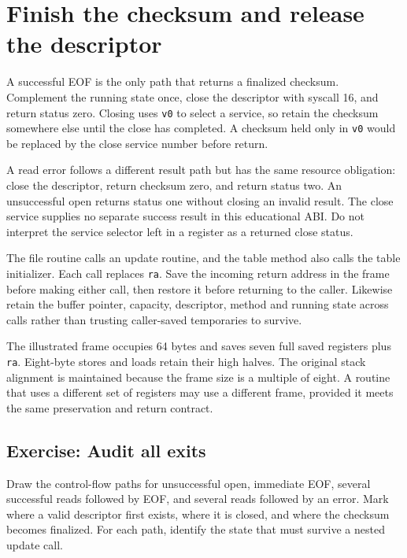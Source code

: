\section{Finish the checksum and release the descriptor}
A successful EOF is the only path that returns a finalized checksum. Complement the
running state once, close the descriptor with syscall 16, and return status zero.
Closing uses \texttt{v0} to select a service, so retain the checksum somewhere else
until the close has completed. A checksum held only in \texttt{v0} would be replaced
by the close service number before return.

A read error follows a different result path but has the same resource obligation:
close the descriptor, return checksum zero, and return status two. An unsuccessful
open returns status one without closing an invalid result. The close service supplies
no separate success result in this educational ABI. Do not interpret the service
selector left in a register as a returned close status.

The file routine calls an update routine, and the table method also calls the table
initializer. Each call replaces \texttt{ra}. Save the incoming return address in the
frame before making either call, then restore it before returning to the caller.
Likewise retain the buffer pointer, capacity, descriptor, method and running state
across calls rather than trusting caller-saved temporaries to survive.

The illustrated frame occupies 64 bytes and saves seven full saved registers plus
\texttt{ra}. Eight-byte stores and loads retain their high halves. The original
stack alignment is maintained because the frame size is a multiple of eight. A
routine that uses a different set of registers may use a different frame, provided
it meets the same preservation and return contract.

\subsection*{Exercise: Audit all exits}
Draw the control-flow paths for unsuccessful open, immediate EOF, several successful
reads followed by EOF, and several reads followed by an error. Mark where a valid
descriptor first exists, where it is closed, and where the checksum becomes finalized.
For each path, identify the state that must survive a nested update call.
